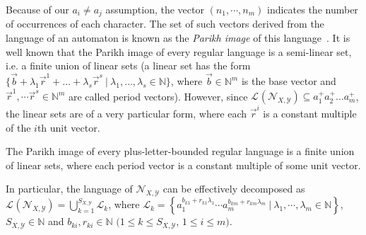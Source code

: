 \documentclass[10pt,a4paper]{amsart}
\numberwithin{equation}{section}
\theoremstyle{plain}
\theoremstyle{definition}
\theoremstyle{remark}
\newcommand\lng[2]{\mathcal{L}_{#1}(#2)}
\newcommand\chr{a}
\newcommand\basevecraw{b}
\newcommand\basevec{\vec{\basevecraw}}
\newcommand\pvecraw{r}
\begin{document}
Because of our $a_i\neq a_{j}$ assumption, the vector $(n_1,\cdots,n_m)$ indicates the number of occurrences of each character.
The set of such vectors derived from the language of an automaton  is known  as the \emph{Parikh image} of this language~\cite{parikh1966context}.
It is  well known that the Parikh image of every regular language is a semi-linear set, i.e. a finite union of linear sets
(a linear set  has the form $\{\basevec+\lambda_1\vec{r}^1 + \dots + \lambda_s \vec{r}^s\ |\   \lambda_1,\dots,\lambda_s \in \mathbb{N} \}$,
where $\basevec \in \mathbb{N}^m$ is the base vector and $\vec{r}^1,\cdots \vec{r}^s\in\mathbb{N}^m$ are called period vectors).
However, since $\lng{}{\mathcal{N}_{X,\mathcal{Y}}} \subseteq \chr_1^+\chr_2^+\dots \chr_m^+$,
the linear sets are of a very particular form,  where each $\vec{r}^i$ is a constant multiple of the $i$th unit vector.

\begin{lem}\label{claim:finiteunion}
The Parikh image of every plus-letter-bounded regular language
is a finite union of linear sets, where each period vector is a constant
multiple of some unit vector.

In particular,
the language of $\mathcal{N}_{X,\mathcal{Y}}$ can be effectively decomposed as $\lng{}{\mathcal{N}_{X,\mathcal{Y}}} = \bigcup\nolimits_{k = 1}^{S_{X,\mathcal{Y}}}\mathcal{L}_k$,
where
$\mathcal{L}_k = \left\{ \chr_1^{\basevecraw_{k1}+ \pvecraw_{k1}\lambda_1}\cdots \chr_m^{\basevecraw_{km}+\pvecraw_{km}\lambda_m } \ | \ \lambda_1,\cdots,\lambda_m\in\mathbb{N}\right\}$, $S_{X,\mathcal{Y}}\in\mathbb{N}$ and  $b_{ki},r_{ki}\in\mathbb{N}$  $(1\le k \le S_{X,\mathcal{Y}}$, $1\le i \le m)$.
\end{lem}
\end{document}
